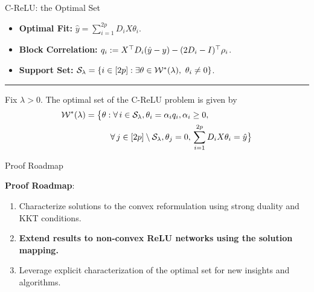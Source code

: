 \documentclass[usenames,dvipsnames,mathserif,notheorems]{beamer}
\newcommand{\horizontalrule}{
	{
			\vspace{-0.5em}
			\center \rule{\textwidth}{0.1em}
			\vspace{-0.2em}
		}
}
\newcommand{\bad}[1]{\textcolor{bad}{#1}}
\newcommand{\good}[1]{\textcolor{good}{#1}}
\begin{document}
\begin{frame}{C-ReLU: the Optimal Set}
	\vspace{-2ex}
	\begin{itemize}
		\item
		      \textbf{Optimal Fit: }       \( \hat y = \sum_{i=1}^{2p} D_i X \theta_i  \).
		      \vspace{1ex}

		\item
		      \textbf{Block Correlation: } \( q_i := X^\top D_i (\hat y - y) - (2D_i - I)^\top \rho_{{i}} \).
		      \pause
		      \vspace{1ex}

		\item
		      \textbf{Support Set: }      \( \mathcal{S}_\lambda
		      = \left\{{i} \in [2p] : \exists \theta \in \mathcal{W}^*(\lambda), \
			      \theta_i \neq 0\right\} \).
	\end{itemize}

	\vspace{-2ex}
	\pause
	\horizontalrule
	\vspace{-1ex}

	\begin{proposition}[Informal]
		Fix \( \lambda > 0 \).
		The optimal set of the C-ReLU problem is
		given by
		\begin{equation*}
			\begin{aligned}
				\mathcal{W}^*(\lambda) =
				\big\{ & \theta  :
				\forall \, {i}  \in  \mathcal{S}_\lambda,
				\theta_i =  \alpha_{i} q_i, \alpha_{i} \geq 0, \,             \\
				       & \quad \forall \, j \in [2p] \setminus \mathcal{S}_\lambda,
				\theta_{j} = 0, \, \sum_{i=1}^{2p} D_i X \theta_i = \hat y
				\big\}
			\end{aligned}
		\end{equation*}
	\end{proposition}

\end{frame}

\begin{frame}{Proof Roadmap}

	{
		\large
		{\Large
			\textbf{Proof Roadmap}:
		}
		\vspace{2em}
		\begin{enumerate}
			\large
			\item Characterize solutions to the \good{convex reformulation}
			      using strong duality and KKT conditions.
			      \vspace{1ex}
			\item \textbf{Extend results to \bad{non-convex} ReLU networks
				      using the solution mapping.}
			      \vspace{1ex}
			\item Leverage explicit characterization of the optimal
			      set for \good{new insights and algorithms}.
		\end{enumerate}
	}

\end{frame}
\end{document}
